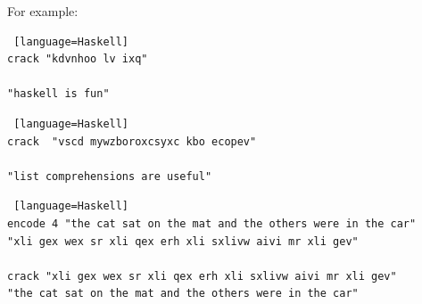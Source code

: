\documentclass{beamer}
\def\frametitle#1{}
\begin{document}
%
 \begin{frame} [fragile]
    \frametitle{Cracking the Code contd.}
For example:
  \begin{onlyenv}
  \begin{lstlisting} [language=Haskell]
crack "kdvnhoo lv ixq"

"haskell is fun"

\end{lstlisting}
 \end{onlyenv}    

 \begin{onlyenv}
  \begin{lstlisting} [language=Haskell]
crack  "vscd mywzboroxcsyxc kbo ecopev" 

"list comprehensions are useful"

\end{lstlisting}
 \end{onlyenv}    



\begin{onlyenv}
 \begin{lstlisting} [language=Haskell]
encode 4 "the cat sat on the mat and the others were in the car"
"xli gex wex sr xli qex erh xli sxlivw aivi mr xli gev"

crack "xli gex wex sr xli qex erh xli sxlivw aivi mr xli gev"
"the cat sat on the mat and the others were in the car"
\end{lstlisting}
\end{onlyenv}    
\end{frame}
\end{document}
